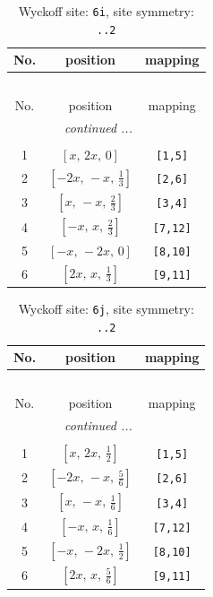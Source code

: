 \documentclass[fleqn,8pt]{jsarticle}
\begin{document}
\renewcommand{\arraystretch}{1.2}
\begin{longtable}{ccc}
\caption{Wyckoff site: {\tt 6i}, site symmetry: {\tt ..2}}
 \\
 \hline \hline
No. & position & mapping \\ \hline \endfirsthead

\multicolumn{2}{l}{\tablename\ \thetable{}} \\
 \hline \hline
No. & position & mapping \\ \hline \endhead

 \hline \hline
\multicolumn{2}{r}{\footnotesize\it continued ...} \\ \endfoot

 \hline \hline
\multicolumn{2}{r}{} \\ \endlastfoot

1 & $\left[ x,\, 2 x,\, 0 \right]$ & {\tt [1,5]} \\ \hline
2 & $\left[ - 2 x,\, - x,\, \frac{1}{3} \right]$ & {\tt [2,6]} \\ \hline
3 & $\left[ x,\, - x,\, \frac{2}{3} \right]$ & {\tt [3,4]} \\ \hline
4 & $\left[ - x,\, x,\, \frac{2}{3} \right]$ & {\tt [7,12]} \\ \hline
5 & $\left[ - x,\, - 2 x,\, 0 \right]$ & {\tt [8,10]} \\ \hline
6 & $\left[ 2 x,\, x,\, \frac{1}{3} \right]$ & {\tt [9,11]} \\
\end{longtable}
\renewcommand{\arraystretch}{1.2}
\begin{longtable}{ccc}
\caption{Wyckoff site: {\tt 6j}, site symmetry: {\tt ..2}}
 \\
 \hline \hline
No. & position & mapping \\ \hline \endfirsthead

\multicolumn{2}{l}{\tablename\ \thetable{}} \\
 \hline \hline
No. & position & mapping \\ \hline \endhead

 \hline \hline
\multicolumn{2}{r}{\footnotesize\it continued ...} \\ \endfoot

 \hline \hline
\multicolumn{2}{r}{} \\ \endlastfoot

1 & $\left[ x,\, 2 x,\, \frac{1}{2} \right]$ & {\tt [1,5]} \\ \hline
2 & $\left[ - 2 x,\, - x,\, \frac{5}{6} \right]$ & {\tt [2,6]} \\ \hline
3 & $\left[ x,\, - x,\, \frac{1}{6} \right]$ & {\tt [3,4]} \\ \hline
4 & $\left[ - x,\, x,\, \frac{1}{6} \right]$ & {\tt [7,12]} \\ \hline
5 & $\left[ - x,\, - 2 x,\, \frac{1}{2} \right]$ & {\tt [8,10]} \\ \hline
6 & $\left[ 2 x,\, x,\, \frac{5}{6} \right]$ & {\tt [9,11]} \\
\end{longtable}
\end{document}
